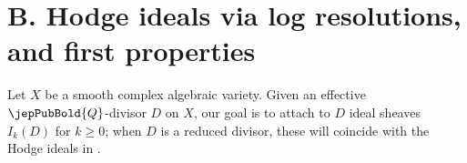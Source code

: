 \section*{B. Hodge ideals via log resolutions, and first properties}


Let $X$ be a smooth complex algebraic variety.
Given an effective $\jepPubBold{Q}$-divisor $D$ on $X$, our goal is to attach to $D$ ideal sheaves $I_k(D)$ for $k \geqslant 0$; when $D$ is a reduced divisor, these will coincide with the Hodge ideals in \cite{MP1}.

